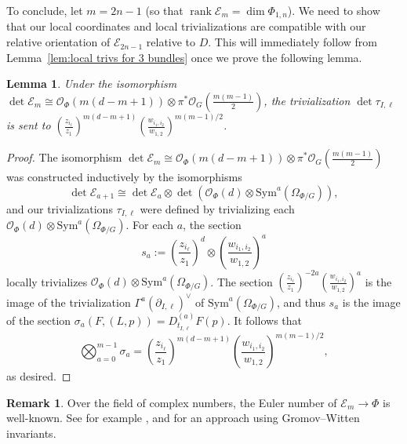 \documentclass[12pt]{amsart}
\numberwithin{equation}{section}
\theoremstyle{plain}
\newtheorem{lem}[thm]{Lemma}
\theoremstyle{definition}
\newtheorem{rem}[thm]{Remark}
\newcommand{\mc}[1]{\mathcal{#1}}
\newcommand{\rank}{\operatorname{rank}}
\newcommand{\Sym}{\mathrm{Sym}}
\begin{document}
To conclude, let $m=2n-1$ (so that $\rank\mc{E}_m=\dim\Phi_{1,n}$). We need to show that our local coordinates and local trivializations are compatible with our relative orientation of $\mc{E}_{2n-1}$ relative to $D$. This will immediately follow from Lemma~\ref{lem:local trivs for 3 bundles} once we prove the following lemma.

\begin{lem}
    Under the isomorphism $\det\mc{E}_m\cong\mc{O}_\Phi(m(d-m+1))\otimes\pi^*\mc{O}_G(\frac{m(m-1)}{2})$, the trivialization $\det\tau_{I,\ell}$ is sent to $\left(\frac{z_{i_\ell}}{z_1}\right)^{m(d-m+1)}\left(\frac{w_{i_1,i_2}}{w_{1,2}}\right)^{m(m-1)/2}$.
\end{lem}
\begin{proof}
    The isomorphism $\det\mc{E}_m\cong\mc{O}_\Phi(m(d-m+1))\otimes\pi^*\mc{O}_G(\frac{m(m-1)}{2})$ was constructed inductively by the isomorphisms
    \[\det\mc{E}_{a+1}\cong\det\mc{E}_a\otimes\det(\mc{O}_\Phi(d)\otimes\Sym^a(\Omega_{\Phi/G})),\]
    and our trivializations $\tau_{I,\ell}$ were defined by trivializing each $\mc{O}_\Phi(d)\otimes\Sym^a(\Omega_{\Phi/G})$. For each $a$, the section
    \[s_a:=\left(\frac{z_{i_\ell}}{z_1}\right)^d\otimes\left(\frac{w_{i_1,i_2}}{w_{1,2}}\right)^a\]
    locally trivializes $\mc{O}_\Phi(d)\otimes\Sym^a(\Omega_{\Phi/G})$. The section $(\frac{z_{i_\ell}}{z_1})^{-2a}(\frac{w_{i_1,i_2}}{w_{1,2}})^a$ is the image of the trivialization $\Gamma^a(\partial_{I,\ell})^\vee$ of $\Sym^a(\Omega_{\Phi/G})$, and thus $s_a$ is the image of the section $\sigma_a(F,(L,p))=D^{(a)}_{t_{I,\ell}}F(p)$. It follows that
    \[\bigotimes_{a=0}^{m-1}\sigma_a=\left(\frac{z_{i_\ell}}{z_1}\right)^{m(d-m+1)}\left(\frac{w_{i_1,i_2}}{w_{1,2}}\right)^{m(m-1)/2},\]
    as desired.
\end{proof}

\begin{rem}
    Over the field of complex numbers, the Euler number of $\mc{E}_m\to\Phi$ is well-known. See for example \cite{bertone}, and \cite[Equation~(3.4)]{mu} for an approach using Gromov--Witten invariants.
\end{rem}
\end{document}
